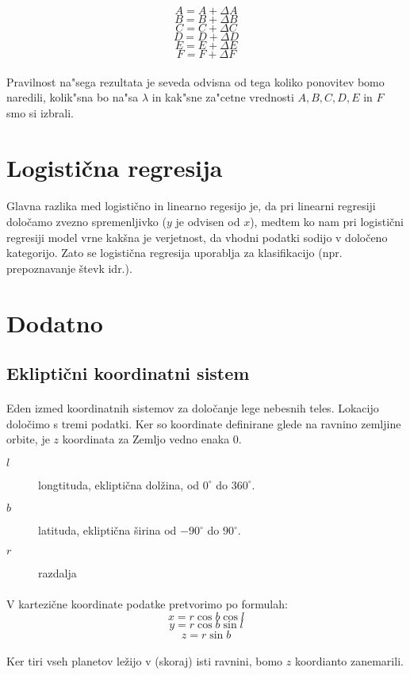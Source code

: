 \documentclass[a4paper, 12pt]{article}
\begin{document}
	$$A = A + \Delta A$$
	$$B = B + \Delta B$$
	$$C = C + \Delta C$$
	$$D = D + \Delta D$$
	$$E = E + \Delta E$$
	$$F = F + \Delta F$$
	
	\paragraph{}Pravilnost na"sega rezultata je seveda odvisna od tega koliko ponovitev bomo naredili, kolik"sna bo na"sa $\lambda$ in kak"sne za"cetne vrednosti $A, B, C, D, E$ in $F$ smo si izbrali.
	
	\section*{Logistična regresija}
	\paragraph{}
	Glavna razlika med logistično in linearno regesijo je, da pri linearni regresiji določamo zvezno spremenljivko ($y$ je odvisen od $x$), medtem ko nam pri logistični regresiji model vrne kakšna je verjetnost, da vhodni podatki sodijo v določeno kategorijo.
	Zato se logistična regresija uporablja za klasifikacijo (npr. prepoznavanje števk idr.).
	
	
	\section*{Dodatno}
	\subsection*{Ekliptični koordinatni sistem}
	\paragraph{}
	Eden izmed koordinatnih sistemov za določanje lege nebesnih teles. Lokacijo določimo s tremi podatki. Ker so koordinate definirane glede na ravnino zemljine orbite, je $z$ koordinata za Zemljo vedno enaka 0.
	\begin{description}
		\item[$l$] longtituda, ekliptična dolžina, od $0^\circ$ do $360^\circ$.
		\item[$b$] latituda, ekliptična širina od $-90^\circ$ do $90^\circ$.
		\item[$r$] razdalja
	\end{description}
	
	\paragraph{}
	V kartezične koordinate podatke pretvorimo po formulah:
	$$x = r \cos b \cos l$$
	$$y = r \cos b \sin l$$
	$$z = r \sin b$$
	
	\paragraph{}
	Ker tiri vseh planetov ležijo v (skoraj) isti ravnini, bomo $z$ koordianto zanemarili.
	
	
\end{document}
